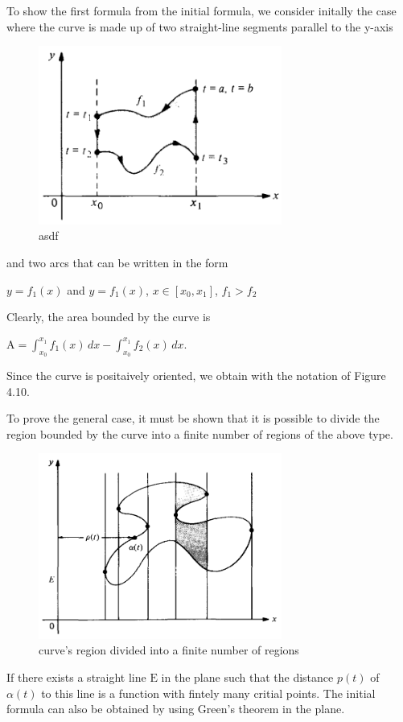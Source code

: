 \documentclass[a4paper]{book}
\numberwithin{theorem}{section}%
\begin{document}
To show the first formula from the initial formula, we consider initally the case where the curve is made up of two straight-line segments parallel to the y-axis
\newpage
\begin{figure}[hbt!]
    \begin{center}   
        \includegraphics[width=80mm]{Schmidt1}
        \caption{asdf}
    \end{center}
\end{figure}\leavevmode
and two arcs that can be written in the form
\begin{center}
    $y=f_{1}(x)$ and $y=f_{1}(x)$, $x\in[x_{0},x_{1}]$, $f_{1}>f_{2}$
\end{center}
Clearly, the area bounded by the curve is
\begin{center}
    $\mathrm{A}=\int_{x_{0}}^{x_{1}}f_{1}(x)\,dx-\int_{x_{0}}^{x_{1}}f_{2}(x)\,dx$.
\end{center}
Since the curve is positaively oriented, we obtain with the notation of Figure 4.10.

To prove the general case, it must be shown that it is possible to divide the region bounded by the curve into a finite number of regions of the above type.
\begin{figure}[hbt!]
    \begin{center}   
        \includegraphics[width=80mm]{Schmidt2}
        \caption{curve's region divided into a finite number of regions}
    \end{center}
\end{figure}\leavevmode
If there exists a straight line $\mathrm{E}$ in the plane such that the distance $p(t)$ of $\alpha(t)$ to this line is a function with fintely many critial points. The initial formula can also be obtained by using Green's theorem in the plane.
\end{document}
